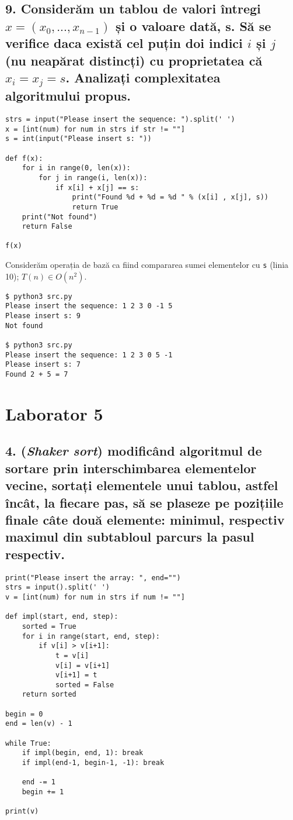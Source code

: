 \documentclass[11pt]{article}
\begin{document}
\subsection*{9. Considerăm un tablou de valori întregi \(x = (x_0, ..., x_{n-1})\) și o valoare dată, s. Să se verifice daca există cel puțin doi indici \(i\) și \(j\) (nu neapărat distincți) cu proprietatea că \(x_i = x_j = s\). Analizați complexitatea algoritmului propus.}
\label{sec:orgbe538f7}

\begin{verbatim}
strs = input("Please insert the sequence: ").split(' ')
x = [int(num) for num in strs if str != ""]
s = int(input("Please insert s: "))

def f(x):
    for i in range(0, len(x)):
        for j in range(i, len(x)):
            if x[i] + x[j] == s:
                print("Found %d + %d = %d " % (x[i] , x[j], s))
                return True
    print("Not found")
    return False

f(x)
\end{verbatim}
Considerăm operația de bază ca fiind compararea sumei elementelor cu \texttt{s} (linia 10);
$T(n) \in O(n^2)$.
\begin{verbatim}
$ python3 src.py
Please insert the sequence: 1 2 3 0 -1 5
Please insert s: 9
Not found

$ python3 src.py
Please insert the sequence: 1 2 3 0 5 -1
Please insert s: 7
Found 2 + 5 = 7 
\end{verbatim}

\pagebreak
\section*{Laborator 5}
\label{sec:org032c0cf}
\subsection*{4. (\textit{Shaker sort}) modificând algoritmul de sortare prin interschimbarea elementelor vecine, sortați elementele unui tablou, astfel încât, la fiecare pas, să se plaseze pe pozițiile finale câte două elemente: minimul, respectiv maximul din subtabloul parcurs la pasul respectiv.}
\label{sec:org40eb63b}

\begin{verbatim}
print("Please insert the array: ", end="")
strs = input().split(' ')
v = [int(num) for num in strs if num != ""]

def impl(start, end, step):
    sorted = True
    for i in range(start, end, step):
        if v[i] > v[i+1]:
            t = v[i]
            v[i] = v[i+1]
            v[i+1] = t
            sorted = False
    return sorted

begin = 0
end = len(v) - 1

while True:
    if impl(begin, end, 1): break
    if impl(end-1, begin-1, -1): break

    end -= 1
    begin += 1

print(v)

\end{verbatim}
\end{document}
